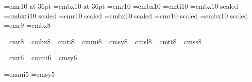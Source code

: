 


\font\thirtysixpoint=cmr10 at 36pt
\font\thirtysixbold=cmbx10 at 36pt
\font\tenpoint=cmr10
\font\tenbold=cmbx10
\font\tenit=cmti10
\font\boldfourteen=cmbx10 scaled  %
\font\boldfourteenitalic=cmbxti10 scaled    %
\font\twelverm=cmr10 scaled
\font\twelvebold=cmbx10 scaled
\font\eleven=cmr10 scaled \magstephalf   %
\font\elevenbold=cmbx10 scaled \magstephalf   %
\font\nine=cmr9
\font\boldeight=cmbx8

\font\eightrm=cmr8
\font\eightbf=cmbx8
\font\eightit=cmti8
\font\eighti=cmmi8
\font\eightsy=cmsy8
\font\eightsl=cmsl8
\font\eighttt=cmtt8
\font\eightsf=cmss8

     
\font\sixrm=cmr6
\font\sixi=cmmi6
\font\sixsy=cmsy6
     
\font\fivei=cmmi5
\font\fivesy=cmsy5
     
\ifx\selectfont\undefined %
\def\eightpoint{\def\rm{\fam0\eightrm}%
  \textfont0=\eightrm \scriptfont0=\sixrm
  \textfont1=\eighti \scriptfont1=\sixi \scriptscriptfont1=\fivei
  \textfont2=\eightsy \scriptfont2=\sixsy \scriptscriptfont2=\fivesy
  \def\it{\fam\itfam\eightit}%
  \textfont\itfam=\eightit
  \def\sl{\fam\slfam\eightsl}%
  \textfont\slfam=\eightsl
  \def\bf{\fam\bffam\eightbf}%
  \textfont\bffam=\eightbf
  \def\tt{\fam\ttfam\eighttt}%
  \textfont\ttfam=\eighttt
  \def\sf{\fam\sffam\eightsf}%
  \textfont\sffam=\eightsf
  \setbox\strutbox=\hbox{\vrule height8pt depth3pt width0pt}%
  \baselineskip=9pt\rm}
\else  %
\def\eightpoint{\fontsize{8}{9pt}\fontfamily{cmr}%
   \fontseries{m}\fontshape{n}\selectfont
  \setbox\strutbox=\hbox{\vrule height8pt depth3pt width0pt}}
\fi



